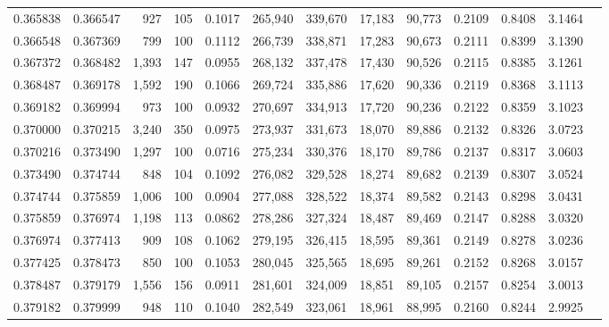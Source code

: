 \begin{tabular}{rrrrrrrrrrrrr}
0.365838 & 0.366547 &   927 & 105 &                                     0.1017 & 265,940 & 339,670 &  17,183 &  90,773 & 0.2109 & 0.8408 & 3.1464 \\
0.366548 & 0.367369 &   799 & 100 &                                     0.1112 & 266,739 & 338,871 &  17,283 &  90,673 & 0.2111 & 0.8399 & 3.1390 \\
0.367372 & 0.368482 & 1,393 & 147 &                                     0.0955 & 268,132 & 337,478 &  17,430 &  90,526 & 0.2115 & 0.8385 & 3.1261 \\
0.368487 & 0.369178 & 1,592 & 190 &                                     0.1066 & 269,724 & 335,886 &  17,620 &  90,336 & 0.2119 & 0.8368 & 3.1113 \\
0.369182 & 0.369994 &   973 & 100 &                                     0.0932 & 270,697 & 334,913 &  17,720 &  90,236 & 0.2122 & 0.8359 & 3.1023 \\
0.370000 & 0.370215 & 3,240 & 350 &                                     0.0975 & 273,937 & 331,673 &  18,070 &  89,886 & 0.2132 & 0.8326 & 3.0723 \\
0.370216 & 0.373490 & 1,297 & 100 &                                     0.0716 & 275,234 & 330,376 &  18,170 &  89,786 & 0.2137 & 0.8317 & 3.0603 \\
0.373490 & 0.374744 &   848 & 104 &                                     0.1092 & 276,082 & 329,528 &  18,274 &  89,682 & 0.2139 & 0.8307 & 3.0524 \\
0.374744 & 0.375859 & 1,006 & 100 &                                     0.0904 & 277,088 & 328,522 &  18,374 &  89,582 & 0.2143 & 0.8298 & 3.0431 \\
0.375859 & 0.376974 & 1,198 & 113 &                                     0.0862 & 278,286 & 327,324 &  18,487 &  89,469 & 0.2147 & 0.8288 & 3.0320 \\
0.376974 & 0.377413 &   909 & 108 &                                     0.1062 & 279,195 & 326,415 &  18,595 &  89,361 & 0.2149 & 0.8278 & 3.0236 \\
0.377425 & 0.378473 &   850 & 100 &                                     0.1053 & 280,045 & 325,565 &  18,695 &  89,261 & 0.2152 & 0.8268 & 3.0157 \\
0.378487 & 0.379179 & 1,556 & 156 &                                     0.0911 & 281,601 & 324,009 &  18,851 &  89,105 & 0.2157 & 0.8254 & 3.0013 \\
0.379182 & 0.379999 &   948 & 110 &                                     0.1040 & 282,549 & 323,061 &  18,961 &  88,995 & 0.2160 & 0.8244 & 2.9925 \\

\end{tabular}
